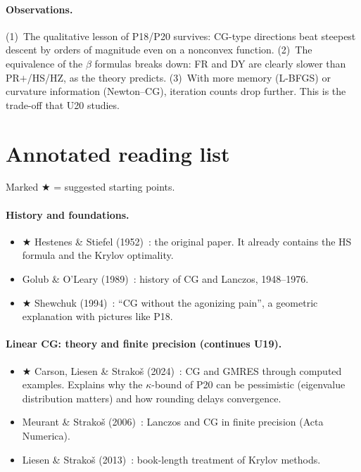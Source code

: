 \documentclass[11pt,a4paper]{article}
\theoremstyle{remark}
\begin{document}
\paragraph{Observations.} (1)~The qualitative lesson of P18/P20 survives: CG-type directions beat steepest descent by orders of magnitude even on a nonconvex function. (2)~The equivalence of the $\beta$ formulas breaks down: FR and DY are clearly slower than PR$+$/HS/HZ, as the theory predicts. (3)~With more memory (L-BFGS) or curvature information (Newton--CG), iteration counts drop further. This is the trade-off that U20 studies.

\section{Annotated reading list}
Marked $\bigstar$ = suggested starting points.

\paragraph{History and foundations.}
\begin{itemize}[leftmargin=1.5em,itemsep=2pt]
\item $\bigstar$ Hestenes \& Stiefel (1952)~\cite{HestenesStiefel1952}: the original paper. It already contains the HS formula and the Krylov optimality.
\item Golub \& O'Leary (1989)~\cite{GolubOLeary1989}: history of CG and Lanczos, 1948--1976.
\item $\bigstar$ Shewchuk (1994)~\cite{Shewchuk1994}: ``CG without the agonizing pain'', a geometric explanation with pictures like P18.
\end{itemize}

\paragraph{Linear CG: theory and finite precision (continues U19).}
\begin{itemize}[leftmargin=1.5em,itemsep=2pt]
\item $\bigstar$ Carson, Liesen \& Strako\v{s} (2024)~\cite{CarsonLiesenStrakos2024}: CG and GMRES through computed examples. Explains why the $\kappa$-bound of P20 can be pessimistic (eigenvalue distribution matters) and how rounding delays convergence.
\item Meurant \& Strako\v{s} (2006)~\cite{MeurantStrakos2006}: Lanczos and CG in finite precision (Acta Numerica).
\item Liesen \& Strako\v{s} (2013)~\cite{LiesenStrakos2013}: book-length treatment of Krylov methods.
\end{itemize}
\end{document}
